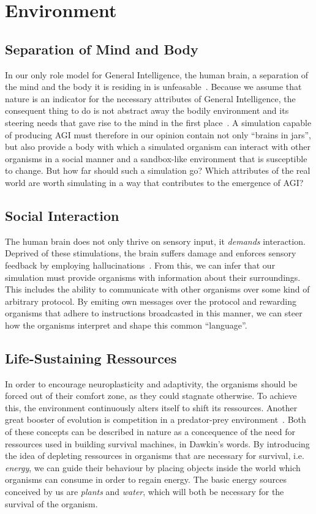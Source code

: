 \section{Environment}

\subsection{Separation of Mind and Body}
In our only role model for General Intelligence, the human brain, a separation of the mind and
the body it is residing in is unfeasable~\cite{Dudai2014}. Because we assume that nature is an 
indicator for the necessary attributes of General Intelligence, the consequent thing to do is not 
abstract away the bodily environment and its steering needs that gave rise to the mind in the first place~\cite{Jekely2010}. 
A simulation capable of producing AGI must therefore in our opinion contain not only ``brains in jars'', but 
also provide a body with which a simulated organism can interact with other organisms in a social manner and a 
sandbox-like environment that is susceptible to change.
But how far should such a simulation go? Which attributes of the real world are worth simulating in a way 
that contributes to the emergence of AGI\@?

\subsection{Social Interaction}
The human brain does not only thrive on sensory input, it
\emph{demands} interaction. Deprived of these stimulations,
the brain suffers damage and enforces sensory feedback by employing
hallucinations~\cite{Grassian2006}. From this, we can infer that
our simulation must provide organisms with information about their surroundings.
This includes the ability to communicate with other organisms over some
kind of arbitrary protocol. By emiting own messages over the protocol and
rewarding organisms that adhere to instructions broadcasted in this manner,
we can steer how the organisms interpret and shape this common ``language''.

\subsection{Life-Sustaining Ressources}
In order to encourage neuroplasticity and adaptivity, the organisms should be 
forced out of their comfort zone, as they could stagnate otherwise.
To achieve this, the environment continuously alters itself to shift its ressources.
Another great booster of evolution is competition in a predator-prey environment~\cite{Dawkins1982}.
Both of these concepts can be described in nature as a concequence of the need for ressources 
used in building survival machines, in Dawkin's words. 
By introducing the idea of depleting ressources in organisms that are necessary for survival, 
i.e. \emph{energy}, we can guide their behaviour by placing objects inside the world which organisms can consume
in order to regain energy. The basic energy sources conceived by us are \emph{plants} and \emph{water}, which will
both be necessary for the survival of the organism.

